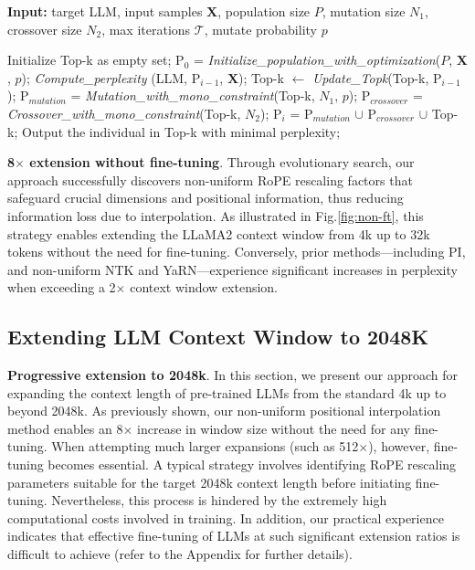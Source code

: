 \begin{algorithm}[t]
	\small
	\caption{The search algorithm}
	\textbf{Input:} target LLM, input samples $\mathbf{X}$, population size $P$, mutation size $N_1$, crossover size $N_2$, max iterations $\mathcal{T}$, mutate probability $p$\\

	\begin{algorithmic}[1]
		\label{alg:search}
		\STATE Initialize Top-k as empty set;	
		\STATE $\text{P}_0$ = \textit{Initialize\_population\_with\_optimization}($P$, $\mathbf{X}$, $p$); 
		\STATE \textit{Compute\_perplexity} (LLM, $\text{P}_{i-1}$, $\mathbf{X}$);
		\STATE  Top-k $\leftarrow$ \textit{Update\_Topk}(Top-k, $\text{P}_{i-1}$);
		\STATE$\text{P}_{mutation}$ = \textit{Mutation\_with\_mono\_constraint}(Top-k, $N_1$, $p$); 
		\STATE $\text{P}_{crossover}$ = \textit{Crossover\_with\_mono\_constraint}(Top-k, $N_2$);
		\STATE $\text{P}_i$ = $\text{P}_{mutation}$ $\cup$ $\text{P}_{crossover}$ $\cup$ Top-k;
		\ENDFOR
		\STATE Output the individual in Top-k with minimal perplexity;
	\end{algorithmic}
\end{algorithm}

\textbf{8$\times$ extension without fine-tuning}. Through evolutionary search, our approach successfully discovers non-uniform RoPE rescaling factors that safeguard crucial dimensions and positional information, thus reducing information loss due to interpolation. As illustrated in Fig.\ref{fig:non-ft}, this strategy enables extending the LLaMA2 context window from 4k up to 32k tokens without the need for fine-tuning. Conversely, prior methods—including PI, and non-uniform NTK and YaRN—experience significant increases in perplexity when exceeding a 2$\times$ context window extension.

\subsection{Extending LLM Context Window to 2048K}
\label{sec:extendto2048k}

\textbf{Progressive extension to 2048k}. In this section, we present our approach for expanding the context length of pre-trained LLMs from the standard 4k up to beyond 2048k. As previously shown, our non-uniform positional interpolation method enables an 8$\times$ increase in window size without the need for any fine-tuning. When attempting much larger expansions (such as 512$\times$), however, fine-tuning becomes essential. A typical strategy involves identifying RoPE rescaling parameters suitable for the target 2048k context length before initiating fine-tuning. Nevertheless, this process is hindered by the extremely high computational costs involved in training. In addition, our practical experience indicates that effective fine-tuning of LLMs at such significant extension ratios is difficult to achieve (refer to the Appendix for further details).

